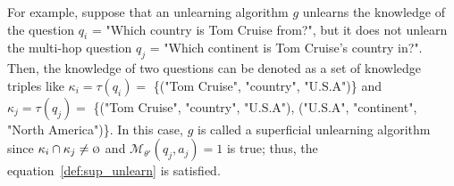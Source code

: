 

For example, suppose that an unlearning algorithm $g$ unlearns the knowledge of the question $q_{i}$ = "Which country is Tom Cruise from?", but it does not unlearn the multi-hop question $q_{j}$ = "Which continent is Tom Cruise’s country in?".
Then, the knowledge of two questions can be denoted as a set of knowledge triples like $\kappa_{i} = \tau(q_{i}) = $ \{("Tom Cruise", "country", "U.S.A")\} and $\kappa_{j} = \tau(q_{j}) = $ \{("Tom Cruise", "country", "U.S.A"), ("U.S.A", "continent", "North America")\}. In this case, $g$ is called a superficial unlearning algorithm since $\kappa_{i} \cap \kappa_{j} \neq \text{\scriptsize Ø}$ and $ \mathcal{M}_{\theta'}(q_{j},a_{j}) = 1$ is true; thus, the equation~\ref{def:sup_unlearn} is satisfied.




